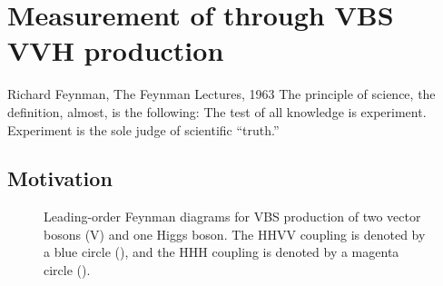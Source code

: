\chapter{Measurement of \kVV through VBS VVH production}
\begin{aquote}{Richard Feynman, The Feynman Lectures, 1963}
The principle of science, the definition, almost, is the following: The test of all knowledge is experiment. 
Experiment is the sole judge of scientific ``truth.''
\end{aquote}
\section{Motivation}
\begin{figure}[htb]
    \centering
    \quad
    \quad
    \caption{
        Leading-order Feynman diagrams for VBS production of two vector bosons (V) and one Higgs boson. 
        The HHVV coupling \kVV is denoted by a blue circle (\textcolor{blue}{}), and the HHH coupling \kHHH is denoted by a magenta circle (\textcolor{magenta}{}). 
    }
    \label{fig:vbsvvh_feynman}
\end{figure}
